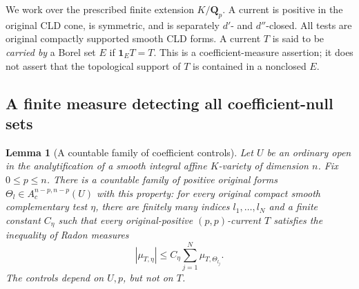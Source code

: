 \documentclass[11pt,a4paper]{article}
\numberwithin{equation}{section}
\newtheorem{lemma}[theorem]{Lemma}
\theoremstyle{definition}
\theoremstyle{remark}
\begin{document}
We work over the prescribed finite extension $K/\mathbf Q_p$.
A current is positive in the original CLD cone, is symmetric,
and is separately $d'$- and $d''$-closed. All tests are original
compactly supported smooth CLD forms. A current $T$ is said to be
\emph{carried by} a Borel set $E$ if $\mathbf1_E T=T$.
This is a coefficient-measure assertion; it does not assert that
the topological support of $T$ is contained in a nonclosed $E$.

\subsection{A finite measure detecting all coefficient-null sets}

\begin{lemma}[A countable family of coefficient controls]
\label{lem:r3-countable-trace-controls}
Let $U$ be an ordinary open in the analytification of a smooth
integral affine $K$-variety of dimension $n$. Fix $0\leq p\leq n$.
There is a countable family of positive original forms
$\Theta_l\in A_c^{n-p,n-p}(U)$ with this property: for every
original compact smooth complementary test $\eta$, there are
finitely many indices $l_1,\ldots,l_N$ and a finite constant
$C_\eta$ such that every original-positive $(p,p)$-current $T$
satisfies the inequality of Radon measures
\[
 |\mu_{T,\eta}|
       \leq C_\eta\sum_{j=1}^N\mu_{T,\Theta_{l_j}}.
 \tag{1}\label{eq:r3-countable-trace-control}
\]
The controls depend on $U,p$, but not on $T$.
\end{lemma}
\end{document}
